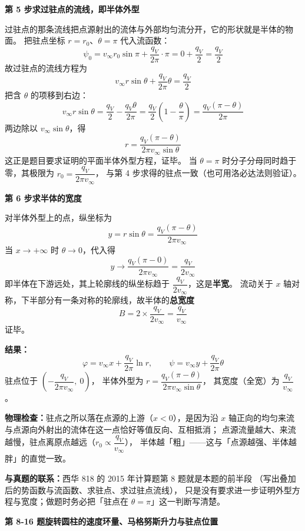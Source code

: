 \begin{jie}
\textbf{第 5 步\quad 求过驻点的流线，即半体外型}

过驻点的那条流线把点源射出的流体与外部均匀流分开，它的形状就是半体的物面。
把驻点坐标 $r=r_0$、$\theta=\pi$ 代入流函数：
\[ \psi_0=v_\infty r_0\sin\pi+\frac{q_V}{2\pi}\cdot\pi=0+\frac{q_V}{2}=\frac{q_V}{2} \]
故过驻点的流线方程为
\[ v_\infty r\sin\theta+\frac{q_V}{2\pi}\theta=\frac{q_V}{2} \]
把含 $\theta$ 的项移到右边：
\[ v_\infty r\sin\theta=\frac{q_V}{2}-\frac{q_V\theta}{2\pi}
 =\frac{q_V}{2}\left(1-\frac{\theta}{\pi}\right)=\frac{q_V(\pi-\theta)}{2\pi} \]
两边除以 $v_\infty\sin\theta$，得
\[ r=\frac{q_V(\pi-\theta)}{2\pi v_\infty\sin\theta} \]
这正是题目要求证明的平面半体外型方程，证毕。
当 $\theta=\pi$ 时分子分母同时趋于零，其极限为 $r_0=\dfrac{q_V}{2\pi v_\infty}$，
与第 4 步求得的驻点一致（也可用洛必达法则验证）。

\textbf{第 6 步\quad 求半体的宽度}

对半体外型上的点，纵坐标为
\[ y=r\sin\theta=\frac{q_V(\pi-\theta)}{2\pi v_\infty} \]
当 $x\to+\infty$ 时 $\theta\to0$，代入得
\[ y\to\frac{q_V(\pi-0)}{2\pi v_\infty}=\frac{q_V}{2v_\infty} \]
即半体在下游远处，其上轮廓线的纵坐标趋于 $\dfrac{q_V}{2v_\infty}$，这是\textbf{半宽}。
流动关于 $x$ 轴对称，下半部分有一条对称的轮廓线，故半体的\textbf{总宽度}
\[ B=2\times\frac{q_V}{2v_\infty}=\frac{q_V}{v_\infty} \]
证毕。

\textbf{结果：}
\[ \varphi=v_\infty x+\frac{q_V}{2\pi}\ln r,\qquad \psi=v_\infty y+\frac{q_V}{2\pi}\theta \]
驻点位于 $\left(-\dfrac{q_V}{2\pi v_\infty},\ 0\right)$，
半体外型为 $r=\dfrac{q_V(\pi-\theta)}{2\pi v_\infty\sin\theta}$，
其宽度（全宽）为 $\dfrac{q_V}{v_\infty}$。

\textbf{物理检查：}驻点之所以落在点源的上游（$x<0$），是因为沿 $x$ 轴正向的均匀来流
与点源向外射出的流体在这一点恰好等值反向、互相抵消；
点源流量越大、来流越慢，驻点离原点越远（$r_0\propto\dfrac{q_V}{v_\infty}$），
半体越「粗」——这与「点源越强、半体越胖」的直觉一致。

\textbf{与真题的联系：}西华 818 的 2015 年计算题第 8 题就是本题的前半段
（写出叠加后的势函数与流函数、求驻点、求过驻点流线），
只是没有要求进一步证明外型方程与宽度；做题时务必把「驻点在 $\theta=\pi$」这一判断写清楚。
\end{jie}

\noindent\textbf{第 8-16 题\quad 旋转圆柱的速度环量、马格努斯升力与驻点位置}

